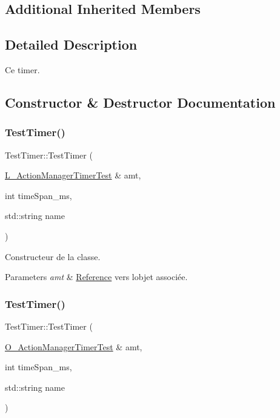 \subsection*{Additional Inherited Members}


\subsection{Detailed Description}
Ce timer. 

\subsection{Constructor \& Destructor Documentation}
\mbox{\label{classTestTimer_a8a2c175537abc63088c9e7dfc3b46979}} 
\subsubsection{\texorpdfstring{Test\+Timer()}{TestTimer()}\hspace{0.1cm}{\footnotesize\ttfamily [1/2]}}
{\footnotesize\ttfamily Test\+Timer\+::\+Test\+Timer (\begin{DoxyParamCaption}\item[{\hyperlink{classL__ActionManagerTimerTest}{L\+\_\+\+Action\+Manager\+Timer\+Test} \&}]{amt,  }\item[{int}]{time\+Span\+\_\+ms,  }\item[{std\+::string}]{name }\end{DoxyParamCaption})}



Constructeur de la classe. 


\begin{DoxyParams}{Parameters}
{\em amt} & \hyperlink{structReference}{Reference} vers l\textquotesingle{}objet associée. \\
\hline
\end{DoxyParams}
\mbox{\label{classTestTimer_a7bd3bc501eab8acb36c03dffc677bf32}} 
\subsubsection{\texorpdfstring{Test\+Timer()}{TestTimer()}\hspace{0.1cm}{\footnotesize\ttfamily [2/2]}}
{\footnotesize\ttfamily Test\+Timer\+::\+Test\+Timer (\begin{DoxyParamCaption}\item[{\hyperlink{classO__ActionManagerTimerTest}{O\+\_\+\+Action\+Manager\+Timer\+Test} \&}]{amt,  }\item[{int}]{time\+Span\+\_\+ms,  }\item[{std\+::string}]{name }\end{DoxyParamCaption})}



